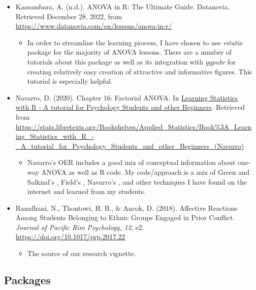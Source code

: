 \documentclass[
  11pt,
]{book}
\providecommand{\tightlist}{%
  \setlength{\itemsep}{0pt}\setlength{\parskip}{0pt}}
\begin{document}
\begin{itemize}
\tightlist
\item
  Kassambara, A. (n.d.). ANOVA in R: The Ultimate Guide. Datanovia. Retrieved December 28, 2022, from \url{https://www.datanovia.com/en/lessons/anova-in-r/}

  \begin{itemize}
  \tightlist
  \item
    In order to streamline the learning process, I have chosen to use \emph{rstatix} package for the majority of ANOVA lessons. There are a number of tutorials about this package as well as its integration with \emph{ggpubr} for creating relatively easy creation of attractive and informative figures. This tutorial is especially helpful.
  \end{itemize}
\item
  Navarro, D. (2020). Chapter 16: Factorial ANOVA. In \href{https://learningstatisticswithr.com/}{Learning Statistics with R - A tutorial for Psychology Students and other Beginners}. Retrieved from \url{https://stats.libretexts.org/Bookshelves/Applied_Statistics/Book\%3A_Learning_Statistics_with_R_-_A_tutorial_for_Psychology_Students_and_other_Beginners_(Navarro)}

  \begin{itemize}
  \tightlist
  \item
    Navarro's OER includes a good mix of conceptual information about one-way ANOVA as well as R code. My code/approach is a mix of Green and Salkind's \citeyearpar{green_using_2017}, Field's \citeyearpar{field_discovering_2012}, Navarro's \citeyearpar{navarro_chapter_2020}, and other techniques I have found on the internet and learned from my students.
  \end{itemize}
\item
  Ramdhani, N., Thontowi, H. B., \& Ancok, D. (2018). Affective Reactions Among Students Belonging to Ethnic Groups Engaged in Prior Conflict. \emph{Journal of Pacific Rim Psychology, 12}, e2. \url{https://doi.org/10.1017/prp.2017.22}

  \begin{itemize}
  \tightlist
  \item
    The source of our research vignette.
  \end{itemize}
\end{itemize}

\hypertarget{packages-4}{%
\subsection{Packages}\label{packages-4}}
\end{document}
